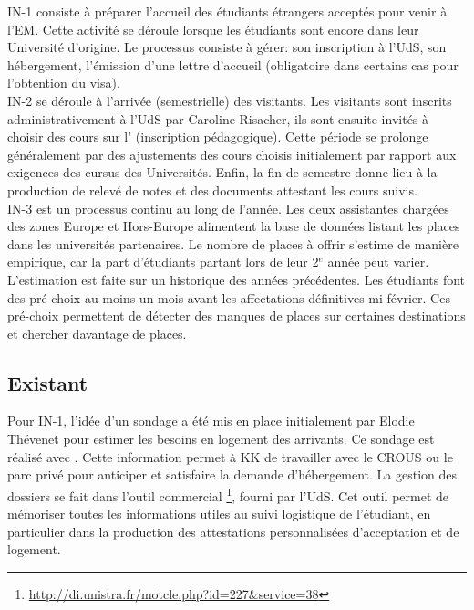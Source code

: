\documentclass{book}
\begin{document}
\bigskip
IN-1 consiste à préparer l'accueil des étudiants étrangers acceptés
pour venir à l'EM. Cette activité se déroule lorsque les étudiants
sont encore dans leur Université d'origine. Le processus consiste 
à gérer: son inscription à l'UdS, son hébergement, l'émission d'une 
lettre d'accueil (obligatoire dans certains cas pour l'obtention du 
visa).  \\

IN-2 se déroule à l'arrivée (semestrielle) des visitants. Les visitants 
sont inscrits administrativement à l'UdS par Caroline Risacher, ils sont 
ensuite invités à choisir des cours sur l' (inscription
pédagogique). Cette période se prolonge généralement par des ajustements
des cours choisis initialement par rapport aux exigences des cursus des 
Universités. Enfin, la fin de semestre donne lieu à la production de
relevé de notes et des documents attestant les cours suivis.\\

IN-3 est un processus continu au long de l'année. Les deux assistantes
chargées des zones Europe et Hors-Europe alimentent la base de données
listant les places dans les universités partenaires. Le nombre de places
à offrir s'estime de manière empirique, car la part d'étudiants partant 
lors de leur 2$^e$ année peut varier. L'estimation est faite sur un 
historique des années précédentes. Les étudiants font des pré-choix
au moins un mois avant les affectations définitives mi-février. Ces 
pré-choix permettent de détecter des manques de places sur certaines
destinations et chercher davantage de places.

\subsection{Existant}

Pour IN-1, l'idée d'un sondage a été mis en place initialement par Elodie 
Thévenet pour estimer les besoins en logement des arrivants. Ce sondage est 
réalisé avec \textit{}. Cette information permet
à KK de travailler avec le CROUS ou le parc privé pour anticiper et satisfaire 
la demande d'hébergement.
La gestion des dossiers se fait dans l'outil commercial \textit{}%
\footnote{\url{http://di.unistra.fr/motcle.php?id=227&service=38}},
fourni par l'UdS. Cet outil permet de mémoriser toutes les informations
utiles au suivi logistique de l'étudiant, en particulier dans la production
des attestations personnalisées d'acceptation et de logement.\\
\end{document}
